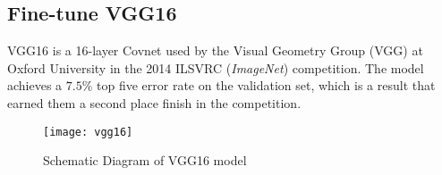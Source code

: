 \subsection{Fine-tune VGG16} 
VGG16 is a 16-layer Covnet used by the Visual Geometry Group (VGG) at Oxford 
University in the 2014 ILSVRC (\emph{ImageNet}) competition. 
The model achieves a $7.5\%$ top five error rate on the validation set, which 
is a result that earned them a second place finish in the competition.
%
\begin{figure}[htb]
\centering
\texttt{[image: vgg16]}
\caption{Schematic Diagram of VGG16 model}
\label{fig:vgg16schema}
\end{figure}
%
%


%
%




